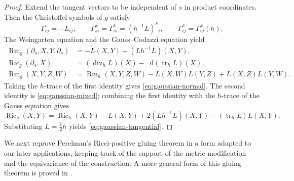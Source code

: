 \documentclass[11pt,reqno]{amsart}
\theoremstyle{definition}
\numberwithin{equation}{section}
\DeclareMathOperator{\Ric}{Ric}
\DeclareMathOperator{\Rm}{Rm}
\DeclareMathOperator{\tr}{tr}
\DeclareMathOperator{\divsymb}{div}
\newcommand{\dd}{\mathop{}\!\mathrm d}
\begin{document}
\begin{proof}
Extend the tangent vectors to be independent of $s$ in product
coordinates.  Then the Christoffel symbols of $g$ satisfy
\[
 \Gamma^s_{ij}=-L_{ij},\qquad
 \Gamma^k_{si}=\Gamma^k_{is}=(h^{-1}L)^k{}_i,
 \qquad \Gamma^k_{ij}=\Gamma^k_{ij}(h).
\]
The Weingarten equation and the Gauss--Codazzi equation yield
\begin{align*}
 \Rm_g(\partial_s,X,Y,\partial_s)
   &=-\dot L(X,Y)+(Lh^{-1}L)(X,Y),\\
 \Ric_g(\partial_s,X)&=(\divsymb_hL)(X)-\dd(\tr_hL)(X),\\
 \Rm_g(X,Y,Z,W)&=\Rm_h(X,Y,Z,W)
 -L(X,W)L(Y,Z)+L(X,Z)L(Y,W).
\end{align*}
Taking the $h$-trace of the first identity gives
\eqref{eq:gaussian-normal}.  The second identity is
\eqref{eq:gaussian-mixed}; combining the first identity with the
$h$-trace of the Gauss equation gives
\[
 \Ric_g(X,Y)=\Ric_h(X,Y)-\dot L(X,Y)
 +2(Lh^{-1}L)(X,Y)-(\tr_hL)L(X,Y).
\]
Substituting $L=\tfrac12\dot h$ yields
\eqref{eq:gaussian-tangential}.
\end{proof}
We next reprove Perelman's Ricci-positive gluing theorem
\cite[Section~4]{Perelman1997} in a form adapted to our later
applications, keeping track of the support of the metric modification
and the equivariance of the construction.  A more general form of this
gluing theorem is proved in \cite{ReiserWraithGluing}.
\end{document}
